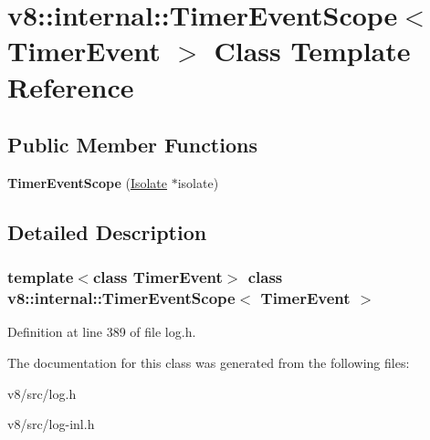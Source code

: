 \hypertarget{classv8_1_1internal_1_1TimerEventScope}{}\section{v8\+:\+:internal\+:\+:Timer\+Event\+Scope$<$ Timer\+Event $>$ Class Template Reference}
\label{classv8_1_1internal_1_1TimerEventScope}
\subsection*{Public Member Functions}
\begin{DoxyCompactItemize}
\item 
\mbox{\label{classv8_1_1internal_1_1TimerEventScope_abc9abae0ace69313684ee43d79e7920a}} 
{\bfseries Timer\+Event\+Scope} (\mbox{\hyperlink{classv8_1_1internal_1_1Isolate}{Isolate}} $\ast$isolate)
\end{DoxyCompactItemize}


\subsection{Detailed Description}
\subsubsection*{template$<$class Timer\+Event$>$\newline
class v8\+::internal\+::\+Timer\+Event\+Scope$<$ Timer\+Event $>$}



Definition at line 389 of file log.\+h.



The documentation for this class was generated from the following files\+:\begin{DoxyCompactItemize}
\item 
v8/src/log.\+h\item 
v8/src/log-\/inl.\+h\end{DoxyCompactItemize}
